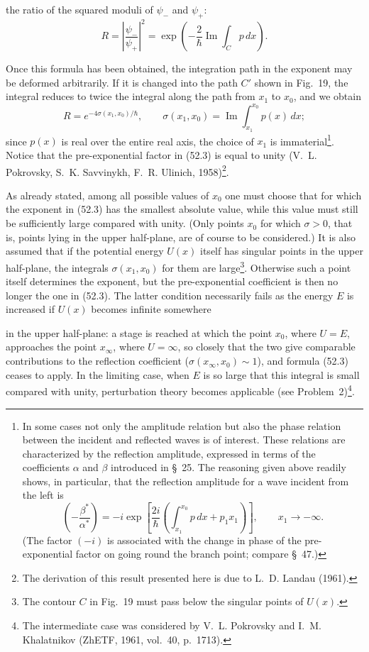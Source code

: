 the ratio of the squared moduli of $\psi_-$ and $\psi_+$:
\begin{equation}
 R=\left|\frac{\psi_-}{\psi_+}\right|^2
 =\exp\left(-\frac2\hbar\operatorname{Im}\int_Cp\,dx\right).
 \tag{52.2}
\end{equation}

Once this formula has been obtained, the integration path in the exponent may
be deformed arbitrarily. If it is changed into the path $C'$ shown in Fig.~19,
the integral reduces to twice the integral along the path from $x_1$ to $x_0$,
and we obtain
\begin{equation}
 R=e^{-4\sigma(x_1,x_0)/\hbar},\qquad
 \sigma(x_1,x_0)=\operatorname{Im}\int_{x_1}^{x_0}p(x)\,dx;
 \tag{52.3}
\end{equation}
since $p(x)$ is real over the entire real axis, the choice of $x_1$ is
immaterial\footnote{In some cases not only the amplitude relation but also the
phase relation between the incident and reflected waves is of interest. These
relations are characterized by the reflection amplitude, expressed in terms
of the coefficients $\alpha$ and $\beta$ introduced in \S~25. The reasoning
given above readily shows, in particular, that the reflection amplitude for a
wave incident from the left is
\[
 \left(-\frac{\beta^*}{\alpha^*}\right)
 =-i\exp\left[\frac{2i}{\hbar}\left(
 \int_{x_1}^{x_0}p\,dx+p_1x_1\right)\right],\qquad x_1\to-\infty.
\]
(The factor $(-i)$ is associated with the change in phase of the
pre-exponential factor on going round the branch point; compare \S~47.)}.
Notice that the pre-exponential factor in (52.3) is equal to unity
(V.~L. Pokrovsky, S.~K. Savvinykh, F.~R. Ulinich, 1958)\footnote{The
derivation of this result presented here is due to L.~D. Landau (1961).}.

As already stated, among all possible values of $x_0$ one must choose that for
which the exponent in (52.3) has the smallest absolute value, while this value
must still be sufficiently large compared with unity. (Only points $x_0$ for
which $\sigma>0$, that is, points lying in the upper half-plane, are of course
to be considered.) It is also assumed that if the potential energy $U(x)$
itself has singular points in the upper half-plane, the integrals
$\sigma(x_1,x_0)$ for them are large\footnote{The contour $C$ in Fig.~19 must
pass below the singular points of $U(x)$.}. Otherwise such a point itself
determines the exponent, but the pre-exponential coefficient is then no longer
the one in (52.3). The latter condition necessarily fails as the energy $E$ is
increased if $U(x)$ becomes infinite somewhere

in the upper half-plane: a stage is reached at which the point $x_0$, where
$U=E$, approaches the point $x_\infty$, where $U=\infty$, so closely that the
two give comparable contributions to the reflection coefficient
($\sigma(x_\infty,x_0)\sim1$), and formula (52.3) ceases to apply. In the
limiting case, when $E$ is so large that this integral is small compared with
unity, perturbation theory becomes applicable (see Problem~2)\footnote{The
intermediate case was considered by V.~L. Pokrovsky and I.~M. Khalatnikov
(ZhETF, 1961, vol.~40, p.~1713).}.
